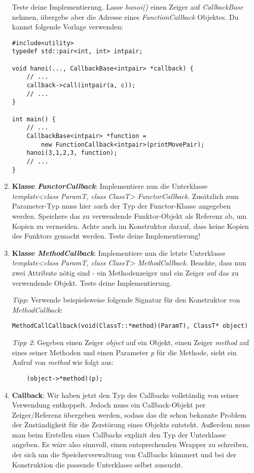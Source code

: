 \documentclass[
  accentcolor=tud1c,	%
  colorbacktitle,		%
  inverttitle,			%
  german,				%
  twoside
]{tudexercise}
\begin{document}
\begin{enumerate}
Teste deine Implementierung.
Lasse \emph{hanoi()} einen Zeiger auf \emph{CallbackBase} nehmen, übergebe aber die Adresse eines \emph{FunctionCallback} Objektes.
Du kannst folgende Vorlage verwenden:
\begin{lstlisting}
#include<utility>
typedef std::pair<int, int> intpair;

void hanoi(..., CallbackBase<intpair> *callback) {
	// ...
	callback->call(intpair(a, c));
	// ...
}

int main() {
	// ...
	CallbackBase<intpair> *function = 
	    new FunctionCallback<intpair>(printMovePair);
	hanoi(3,1,2,3, function);
	// ...
}
\end{lstlisting}


\item
\textbf{Klasse \emph{FunctorCallback}}:
Implementiere nun die Unterklasse \emph{template<class ParamT, class ClassT> FunctorCallback}.
Zusätzlich zum Parameter-Typ muss hier auch der Typ der Functor-Klasse angegeben werden.
Speichere das zu verwendende Funktor-Objekt als Referenz ab, um Kopien zu vermeiden.
Achte auch im Konstruktor darauf, dass keine Kopien des Funktors gemacht werden.
Teste deine Implementierung! 



\item
\textbf{Klasse \emph{MethodCallback}}:
Implementiere nun die letzte Unterklasse \emph{template<class ParamT, class ClassT> MethodCallback}.
Beachte, dass nun zwei Attribute nötig sind - ein Methodenzeiger und ein Zeiger auf das zu verwendende Objekt.
Teste deine Implementierung.

\emph{Tipp}: Verwende beispielsweise folgende Signatur für den Konstruktor von \emph{MethodCallback}:
\begin{lstlisting}
MethodCallCallback(void(ClassT::*method)(ParamT), ClassT* object)
\end{lstlisting}

\emph{Tipp 2}: Gegeben einen Zeiger \emph{object} auf ein Objekt, einen Zeiger \emph{method} auf eines seiner Methoden und einen Parameter \emph{p} für die Methode, sieht ein Aufruf von \emph{method} wie folgt aus:
\begin{lstlisting}
	(object->*method)(p);
\end{lstlisting}

\item
\textbf{Callback}: 
Wir haben jetzt den Typ des Callbacks vollständig von seiner Verwendung entkoppelt.
Jedoch muss ein Callback-Objekt per Zeiger/Referenz übergeben werden, sodass das dir schon bekannte  Problem der Zuständigkeit für die Zerstörung eines Objekts entsteht.
Außerdem muss man beim Erstellen eines Callbacks explizit den Typ der Unterklasse angeben.
Es wäre also sinnvoll, einen entsprechenden Wrapper zu schreiben, der sich um die Speicherverwaltung von Callbacks kümmert und bei der Konstruktion  die passende Unterklasse selbst aussucht.


\end{enumerate}
\end{document}

